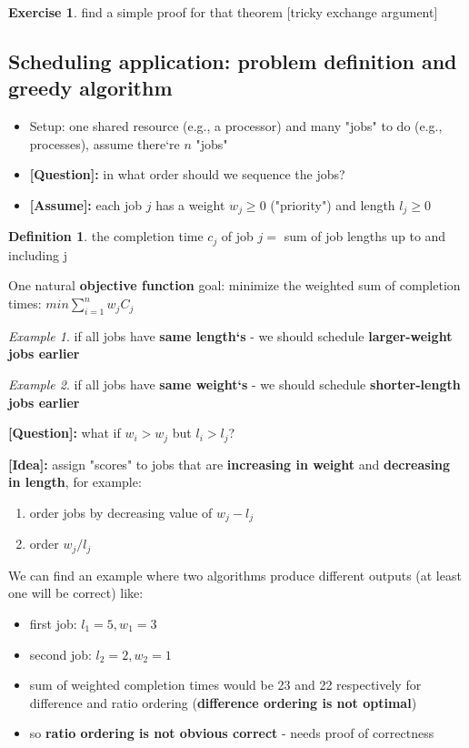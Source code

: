 \documentclass[a4paper,12pt]{article}
\theoremstyle{plain}
\theoremstyle{definition}
\newtheorem{problem}{Exercise}[section]
\newtheorem*{definition}{Definition}
\theoremstyle{remark}
\newtheorem*{example}{Example}
\begin{document}
\begin{problem} find a simple proof for that theorem [tricky exchange argument]\end{problem}



\subsection{Scheduling application: problem definition and greedy algorithm}
\begin{itemize}
\item Setup: one shared resource (e.g., a processor) and many "jobs" to do (e.g., processes), assume there`re $n$ "jobs"
\item \textbf{[Question]:} in what order should we sequence the jobs?
\item \textbf{[Assume]:} each job $j$ has a weight $w_j \geq 0 $ ("priority") and length $l_j \geq	0$
\end{itemize}

\begin{definition}the completion time $c_j$ of job $j =$ sum of job lengths up to and including j \end{definition}

One natural \textbf{objective function} goal: minimize the weighted sum of completion times: $min \sum\limits_{i = 1}^{n}w_jC_j$

\begin{example}if all jobs have \textbf{same length`s} - we should schedule \textbf{larger-weight jobs earlier}\end{example}
\begin{example}if all jobs have \textbf{same weight`s} - we should schedule \textbf{shorter-length jobs earlier}\end{example}

\textbf{[Question]:} what if $w_i > w_j$ but $l_i > l_j$?

\textbf{[Idea]:} assign "scores" to jobs that are \textbf{increasing in weight} and \textbf{decreasing in length}, for example:
\begin{enumerate}
\item order jobs by decreasing value of $w_j - l_j$
\item order $w_j/l_j$
\end{enumerate}

We can find an example where two algorithms produce different outputs (at least one will be correct) like:
\begin{itemize}
\item first job: $l_1=5, w_1=3$
\item second job: $l_2=2, w_2=1$
\item sum of weighted completion times would be 23 and 22 respectively for difference and ratio ordering (\textbf{difference ordering is not optimal})
\item so \textbf{ratio ordering is not obvious correct} - needs proof of correctness
\end{itemize}
\end{document}
